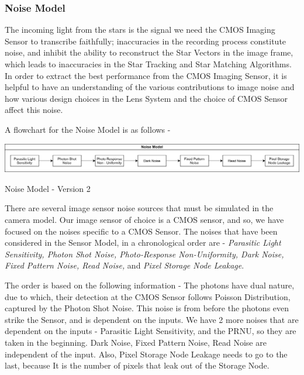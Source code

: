 

\subsubsection{Noise Model} %
The incoming light from the stars is the signal we need the CMOS Imaging Sensor to transcribe faithfully; inaccuracies in the recording process constitute noise, and inhibit the ability to reconstruct the Star Vectors in the image frame, which leads to inaccuracies in the Star Tracking and Star Matching Algorithms. In order to extract the best performance from the CMOS Imaging Sensor, it is helpful to have an understanding of the various contributions to image noise and how various design choices in the Lens System and the choice of CMOS Sensor affect this noise.

A flowchart for the Noise Model is as follows -

\begin{Flowchart}[h!]
    \centering
    \includegraphics[scale=0.09]{Figures/Model/Noise Model.png}
    \caption{Noise Model - Version 2}
    \label{fig:SIS_v2_NM}
\end{Flowchart}

There are several image sensor noise sources that must be simulated in the camera model. Our image sensor of choice is a CMOS sensor, and so, we have focused on the noises specific to a CMOS Sensor. The noises that have been considered in the Sensor Model, in a chronological order are - \emph{Parasitic Light Sensitivity, Photon Shot Noise, Photo-Response Non-Uniformity, Dark Noise, Fixed Pattern Noise, Read Noise,} and \emph{Pixel Storage Node Leakage}.

The order is based on the following information - 
The photons have dual nature, due to which, their detection at the CMOS Sensor follows Poisson Distribution, captured by the Photon Shot Noise. This noise is from before the photons even strike the Sensor, and is dependent on the inputs. We have 2 more noises that are dependent on the inputs - Parasitic Light Sensitivity, and the PRNU, so they are taken in the beginning. Dark Noise, Fixed Pattern Noise, Read Noise are independent of the input. Also, Pixel Storage Node Leakage needs to go to the last, because It is the number of pixels that leak out of the Storage Node.

